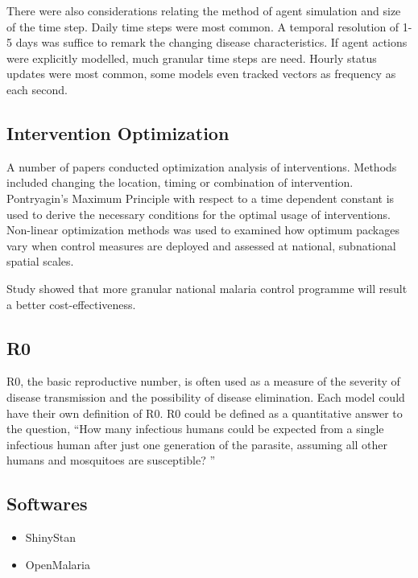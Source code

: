 \documentclass[a4paper, 12pt, twoside]{article}
\begin{document}
There were also considerations relating the method of agent simulation and size of the time step.
Daily time steps were most common.
A temporal resolution of 1-5 days was suffice to remark the changing disease characteristics.
If agent actions were explicitly modelled, much granular time steps are need.
Hourly status updates were most common, some models even tracked vectors as frequency as each second.

\subsection{Intervention Optimization}
A number of papers\cite{Tchoumi2020} conducted optimization analysis of interventions.
Methods included changing the location, timing or combination of intervention.
Pontryagin’s Maximum Principle\cite{Tchoumi2020} with respect to a time dependent constant is used to derive the necessary conditions for the optimal usage of interventions.
Non-linear optimization methods\cite{Walker2016} was used to examined how optimum packages vary when control measures are deployed and assessed at national, subnational spatial scales.

Study showed that more granular national malaria control programme will result a better cost-effectiveness\cite{Walker2016}.
\subsection{\texorpdfstring{\gls{R0}}{R0}}%
\label{sub:R0}
\gls{R0}, the basic reproductive number, is often used as a measure of the severity of disease transmission and the possibility of disease elimination.
Each model could have their own definition of \gls{R0}.
\gls{R0} could be defined as a quantitative answer to the question, “How many infectious humans could be expected from a single infectious human after just one generation of the parasite, assuming all other humans and mosquitoes are susceptible? ”

\subsection{Softwares}

\begin{itemize}
	\item ShinyStan
    \item OpenMalaria
\end{itemize}
\end{document}
